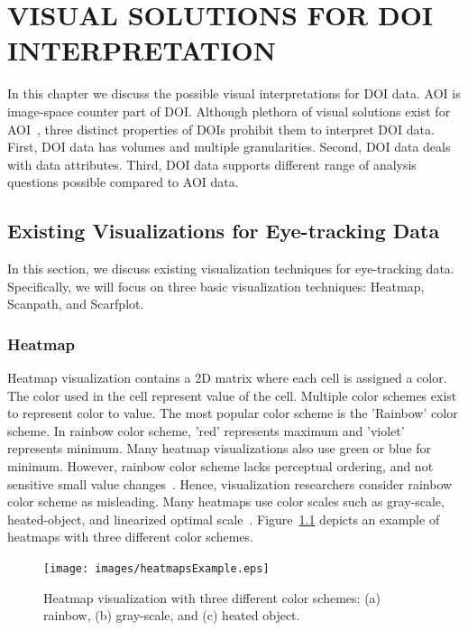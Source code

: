 \chapter{VISUAL SOLUTIONS FOR DOI INTERPRETATION}
In this chapter we discuss the possible visual interpretations for DOI data. AOI is image-space counter part of DOI. Although plethora of visual solutions exist for AOI~\cite{Bla14}, three distinct properties of DOIs prohibit them to interpret DOI data. First, DOI data has volumes and multiple granularities. Second, DOI data deals with data attributes. Third, DOI data supports different range of analysis questions possible compared to AOI data. 

\section{Existing Visualizations for Eye-tracking Data}
\label{sec:ClassicVisualization}
In this section, we discuss existing visualization techniques for eye-tracking data. Specifically, we will focus on three basic visualization techniques: Heatmap, Scanpath, and Scarfplot. %

\subsection{Heatmap}
Heatmap visualization contains a 2D matrix where each cell is assigned a color. The color used in the cell represent value of the cell. Multiple color schemes exist to represent color to value. The most popular color scheme is the 'Rainbow' color scheme. In rainbow color scheme, 'red' represents maximum and 'violet' represents minimum. Many heatmap visualizations also use green or blue for minimum. However, rainbow color scheme lacks perceptual ordering, and not sensitive small value changes~\cite{borland2007rainbow}. Hence, visualization researchers consider rainbow color scheme as misleading. Many heatmaps use color scales such as gray-scale, heated-object, and linearized optimal scale~\cite{silva2007there}. Figure~\ref{fig:heatmapsExample} depicts an example of heatmaps with three different color schemes. 

\begin{figure}[htbp]
  \centering
  \texttt{[image: images/heatmapsExample.eps]}
  \caption{Heatmap visualization with three different color schemes: (a) rainbow, (b) gray-scale, and (c) heated object.}
	\label{fig:heatmapsExample}
\end{figure}



